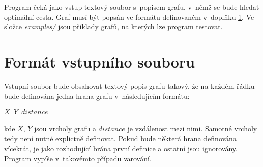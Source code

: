 \documentclass[a4paper, 12pt]{article}
\begin{document}
Program čeká jako vstup textový soubor s~popisem grafu, v~němž se bude hledat optimální cesta. Graf musí být popsán ve formátu definovaném 
v~doplňku \ref{app:format}. Ve složce \emph{examples/} jsou příklady grafů, na kterých lze program testovat.
\label{app:help}
\section{Formát vstupního souboru}
\label{app:format}
Vstupní soubor bude obsahovat textový popis grafu takový, že na každém řádku bude definována jedna hrana grafu v~následujícím formátu:
\begin{center}
  \texttt{$X$ $Y$ $distance$}
\end{center}
kde $X$, $Y$ jsou vrcholy grafu a $distance$ je vzdálenost mezi nimi. Samotné vrcholy tedy není nutné explictně definovat. Pokud bude některá hrana
definována vícekrát, je jako rozhodující brána první definice a ostatní jsou ignorovány. Program vypíše v~takovémto případu varování.

\newpage


\end{document}
